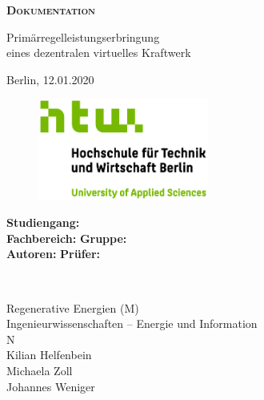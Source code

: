 \begin{titlepage}
	\begin{center}
	
		\vspace*{1cm}
		
		\textbf{\textsc{{\huge Dokumentation}}}
 
		\vspace{0.5cm}

		{\Large Primärregelleistungserbringung\\\medskip\noindent eines dezentralen virtuelles Kraftwerk}
 
		\vspace{0.5cm}

		Berlin, 12.01.2020
       
		\vspace*{1cm}
       
		\begin{figure}[H]
			\includegraphics[width=0.5\textwidth, center]{Bilder/HTWLogo.jpg}
		\end{figure}
 
		\vfill
 
		\vspace{0.8cm}
 
		\begin{minipage}{0.45\textwidth}
			\begin{flushleft}
				\textbf{Studiengang:}\\
				\textbf{Fachbereich:}\newline\newline
				\textbf{Gruppe:}\\
				\textbf{Autoren:}\newline\newline
				\textbf{Prüfer:}\\
			\end{flushleft}
		\end{minipage}~
		\begin{minipage}{0.45\textwidth}            
			\begin{flushright}
				Regenerative Energien (M)\\
				Ingenieurwissenschaften – Energie und Information\\
				N\\
				Kilian Helfenbein\\
				Michaela Zoll\\
				Johannes Weniger\\
			\end{flushright}        
		\end{minipage}\\[2 cm]
		
	\end{center}
\end{titlepage}

\newpage